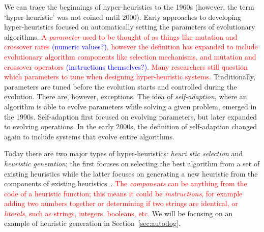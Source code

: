 \documentclass{sig-alternate}
\begin{document}
We can trace the beginnings of hyper-heuristics to the 1960s (however, the term `hyper-heuristic' was not coined until 2000). Early approaches to developing hyper-heuristics focused on automatically setting the parameters of evolutionary algorithms. \textcolor{red}{A \textit{parameter} used to be thought of as things like mutation and crossover rates \textcolor{blue}{(numeric values?)}, however the definition has expanded to include evolutionary algorithm components like selection mechanisms, and mutation and crossover operators \textcolor{blue}{(instructions themselves?)}. Many researchers still question which parameters to tune when designing hyper-heuristic systems.}  Traditionally, parameters are tuned before the evolution starts and controlled during the evolution. There are, however, exceptions. The idea of \textit{self-adaption}, where an algorithm is able to evolve parameters while solving a given problem, emerged in the 1990s. Self-adaption first focused on evolving parameters, but later expanded to evolving operations. In the early 2000s, the definition of self-adaption changed again to include systems that evolve entire algorithms.~\cite{pappa:2014}

Today there are two major types of hyper-heuristics: \textit{heuri\- stic selection} and \textit{heuristic generation}; the first focuses on selecting the best algorithm from a set of existing heuristics while the latter focuses on generating a new heuristic from the components of existing heuristics~\cite{pappa:2014}. \textcolor{red}{The \textit{components} can be anything from the code of a heuristic function; this means it could be \textit{instructions}, for example adding two numbers together or determining if two strings are identical, or \textit{literals}, such as strings, integers, booleans, etc.}  We will be focusing on an example of heuristic generation in Section~\ref{sec:autodog}.
\end{document}
